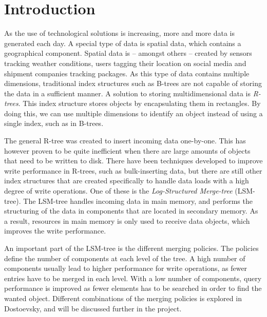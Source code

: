\chapter{Introduction}
As the use of technological solutions is increasing, more and more data is generated each day. A special type of data is spatial data, which contains a geographical component. Spatial data is – amongst others – created by sensors tracking weather conditions, users tagging their location on social media and shipment companies tracking packages. As this type of data contains multiple dimensions, traditional index structures such as B-trees are not capable of storing the data in a sufficient manner. A solution to storing multidimensional data is \emph{R-trees}\cite{r-tree}. This index structure stores objects by encapsulating them in rectangles. By doing this, we can use multiple dimensions to identify an object instead of using a single index, such as in B-trees. \newline

\noindent
The general R-tree was created to insert incoming data one-by-one. This has however proven to be quite inefficient when there are large amounts of objects that need to be written to disk. There have been techniques developed to improve write performance in R-trees, such as bulk-inserting data\cite{SeededClustering}\cite{GBI}\cite{STLT}, but there are still other index structures that are created specifically to handle data loads with a high degree of write operations. One of these is the \emph{Log-Structured Merge-tree} (LSM-tree)\cite{LSMTree}. The LSM-tree handles incoming data in main memory, and performs the structuring of the data in components that are located in secondary memory. As a result, resources in main memory is only used to receive data objects, which improves the write performance.\newline

\noindent
An important part of the LSM-tree is the different merging policies. The policies define the number of components at each level of the tree. A high number of components usually lead to higher performance for write operations, as fewer entries have to be merged in each level. With a low number of components, query performance is improved as fewer elements has to be searched in order to find the wanted object. Different combinations of the merging policies is explored in Dostoevsky\cite{Dostoevsky}, and will be discussed further in the project.\newline

